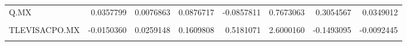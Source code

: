 \begin{table}
\begin{tabular}{lrrrrrrr}
Q.MX & 0.0357799 & 0.0076863 & 0.0876717 & -0.0857811 & 0.7673063 & 0.3054567 & 0.0349012\\
\cellcolor{gray!10}{RA.MX} & \cellcolor{gray!10}{0.0032577} & \cellcolor{gray!10}{0.0062751} & \cellcolor{gray!10}{0.0792155} & \cellcolor{gray!10}{0.3814986} & \cellcolor{gray!10}{0.8574078} & \cellcolor{gray!10}{-0.0724902} & \cellcolor{gray!10}{-0.0066973}\\
\addlinespace
TLEVISACPO.MX & -0.0150360 & 0.0259148 & 0.1609808 & 0.5181071 & 2.6000160 & -0.1493095 & -0.0092445\\
\cellcolor{gray!10}{VESTA.MX} & \cellcolor{gray!10}{0.0084706} & \cellcolor{gray!10}{0.0041270} & \cellcolor{gray!10}{0.0642418} & \cellcolor{gray!10}{0.4931473} & \cellcolor{gray!10}{1.0421139} & \cellcolor{gray!10}{-0.0082401} & \cellcolor{gray!10}{-0.0005080}\\
\bottomrule
\end{tabular}
\end{table}